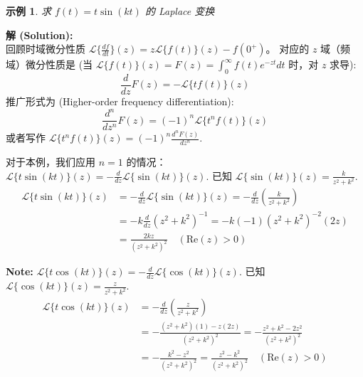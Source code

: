 \documentclass[linespread=1.5,openany]{book}%
\def\diff{d}%
\theoremstyle{plain}
\newtheorem{example}[theorem]{示例}
\newcommand{\diff}{\mathop{}\!\mathrm{d}}  %
\begin{document}
{{{{{{								
								\vspace{\baselineskip}
								\begin{example}求 $f(t)=t\sin(kt)$ 的 Laplace 变换 \label{ex:L15_freq_diff_tsinkt_new}
								\end{example}
								\noindent\textbf{解 (Solution):} \\
								回顾时域微分性质 $\mathcal{L}\{\frac{\diff f}{\diff t}\}(z) = z\mathcal{L}\{f(t)\}(z) - f(0^+)$。
								对应的 $z$ 域（频域）微分性质是 (当 $\mathcal{L}\{f(t)\}(z) = F(z) = \int_0^\infty f(t)e^{-zt} \diff t$ 时，对 $z$ 求导):
								\[ \frac{\diff}{\diff z} F(z) = -\mathcal{L}\{tf(t)\}(z) \]
								推广形式为 (Higher-order frequency differentiation):
								\begin{equation} \label{eq:L15_freq_diff_gen_new}
									\frac{\diff^n}{\diff z^n} F(z) = (-1)^n \mathcal{L}\{t^n f(t)\}(z)
								\end{equation}
								或者写作 $\mathcal{L}\{t^n f(t)\}(z) = (-1)^n \frac{\diff^n F(z)}{\diff z^n}$.
								
								对于本例，我们应用 $n=1$ 的情况： $\mathcal{L}\{t\sin(kt)\}(z) = -\frac{\diff}{\diff z} \mathcal{L}\{\sin(kt)\}(z)$.
								已知 $\mathcal{L}\{\sin(kt)\}(z) = \frac{k}{z^2+k^2}$.
								\begin{align*}
									\mathcal{L}\{t\sin(kt)\}(z) & = -\frac{\diff}{\diff z} \mathcal{L}\{\sin(kt)\}(z)= -\frac{\diff}{\diff z} \left( \frac{k}{z^2+k^2} \right) \\[6pt]
									&= -k \frac{\diff}{\diff z} (z^2+k^2)^{-1} 
									= -k (-1)(z^2+k^2)^{-2} (2z) \\[6pt]
									&= \frac{2kz}{(z^2+k^2)^2}\quad (\text{Re}(z)>0)
								\end{align*}
								
								\textbf{Note:}
								$\mathcal{L}\{t\cos(kt)\}(z) = -\frac{\diff}{\diff z} \mathcal{L}\{\cos(kt)\}(z)$.
								已知 $\mathcal{L}\{\cos(kt)\}(z) = \frac{z}{z^2+k^2}$.
								\begin{align*}
									\mathcal{L}\{t\cos(kt)\}(z) &= -\frac{\diff}{\diff z} \left( \frac{z}{z^2+k^2} \right) \\[6pt]
									&= -\frac{(z^2+k^2)(1) - z(2z)}{(z^2+k^2)^2} = -\frac{z^2+k^2 - 2z^2}{(z^2+k^2)^2} \\[6pt]
									&= -\frac{k^2 - z^2}{(z^2+k^2)^2} = \frac{z^2-k^2}{(z^2+k^2)^2} \quad (\text{Re}(z)>0)
								\end{align*}
								\vspace{\baselineskip}
								
}}}}}}
\end{document}
